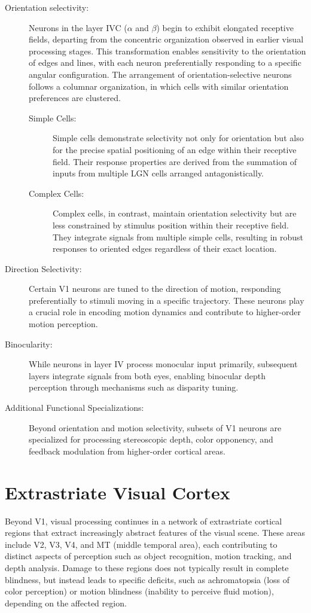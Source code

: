\begin{description}
    \item[Orientation selectivity:] Neurons in the layer IVC ($\alpha$ and $\beta$) begin to exhibit elongated receptive fields, departing from the concentric organization observed in earlier visual processing stages. This transformation enables sensitivity to the orientation of edges and lines, with each neuron preferentially responding to a specific angular configuration. The arrangement of orientation-selective neurons follows a columnar organization, in which cells with similar orientation preferences are clustered.
    \begin{description}
        \item[Simple Cells:] Simple cells demonstrate selectivity not only for orientation 
        but also for the precise spatial positioning of an edge within their receptive field. 
        Their response properties are derived from the summation of inputs from multiple LGN cells arranged antagonistically.
        \item[Complex Cells:] Complex cells, in contrast, maintain orientation selectivity but are less constrained by stimulus position within their receptive field. They 
        integrate signals from multiple simple cells, resulting in robust responses to oriented edges regardless of their exact location.
    \end{description}
    \item[Direction Selectivity:] Certain V1 neurons are tuned to the direction of motion, 
    responding preferentially to stimuli moving in a specific trajectory. These neurons play a crucial role in encoding motion dynamics and contribute to higher-order motion perception.
    \item[Binocularity:] While neurons in layer IV process monocular input primarily, subsequent layers integrate signals from both eyes, enabling binocular depth perception through mechanisms such as disparity tuning.
    \item[Additional Functional Specializations:] Beyond orientation and motion selectivity, 
    subsets of V1 neurons are specialized for processing stereoscopic depth, color opponency, 
    and feedback modulation from higher-order cortical areas.
\end{description}

\section{Extrastriate Visual Cortex}
\label{sec:extrastriate}
Beyond V1, visual processing continues in a network of extrastriate cortical regions
that extract increasingly abstract features of the visual scene. These areas include
V2, V3, V4, and MT (middle temporal area), each contributing to distinct aspects of
perception such as object recognition, motion tracking, and depth analysis. Damage
to these regions does not typically result in complete blindness, but instead leads to
specific deficits, such as achromatopsia (loss of color perception) or motion blindness
(inability to perceive fluid motion), depending on the affected region.
